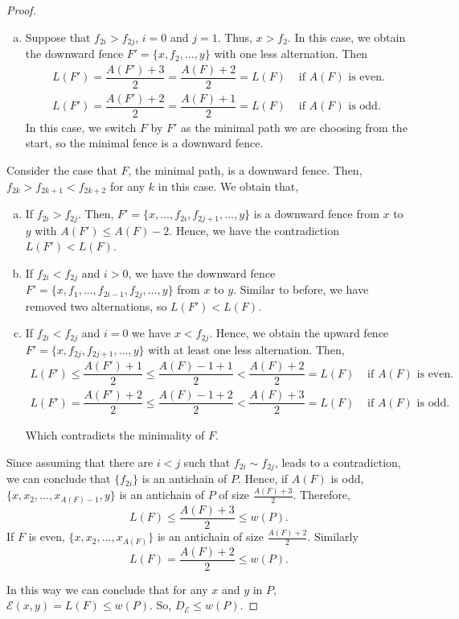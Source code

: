 \documentclass{article}[12pt]
\theoremstyle{exampstyle}
\theoremstyle{remark}
\newcommand{\E}{\mathcal{E}}
\begin{document}
\begin{proof}
\begin{enumerate}[a)]
        \item Suppose that $f_{2i} > f_{2j}$, $i =0$ and $j=1$. Thus, $x > f_2$. In this case, we obtain the downward fence $F'= \{ x , f_2, ..., y\}$ with one less alternation. Then
        \begin{align*}
            L(F') = \dfrac{A(F') + 3}{2} =  \dfrac{A(F) + 2}{2} = L(F) &  \text{ if } A(F) \text{ is even}. \\
            L(F') = \dfrac{A(F') + 2}{2} =  \dfrac{A(F) + 1}{2} = L(F) &  \text{ if } A(F) \text{ is odd}.
        \end{align*}
     In this case, we switch $F$ by $F'$ as the minimal path we are choosing from the start, so the minimal fence is a downward fence.
    \end{enumerate}
    
   Consider the case that $F$, the minimal path, is a downward fence. Then, $f_{2k} > f_{2k+1} < f_{2k+2}$ for any $k$ in this case. We obtain that,
   \begin{enumerate}[a)]
        \item If $f_{2i} > f_{2j}$. Then, $F' = \{ x, ..., f_{2i}, f_{2j+1}, ... ,y\}$ is a downward fence from $x$ to $y$ with $A(F') \leq A(F) - 2$. Hence, we have the contradiction $L(F') < L(F)$.
        \item If $f_{2i} < f_{2j}$ and $i > 0$, we have the downward fence $F' = \{ x, f_1, ..., f_{2i-1}, f_{2j}, ... ,y\}$ from $x$ to $y$. Similar to before, we have removed two alternations, so $L(F') < L(F)$.
        \item If $f_{2i} < f_{2j}$ and $i = 0$ we have $x < f_{2j}$. Hence, we obtain the upward fence $F' = \{ x, f_{2j}, f_{2j+1}, ..., y \}$ with at least one less alternation. Then, 
        \begin{align*}
            L(F') \leq \dfrac{A(F') + 1}{2} \leq  \dfrac{A(F) -1 + 1}{2} < \dfrac{A(F)+ 2}{2} = L(F) &  \text{ if } A(F) \text{ is even}. \\
            L(F') = \dfrac{A(F') + 2}{2} \leq  \dfrac{A(F) -1  + 2}{2} < \dfrac{A(F)+ 3}{2} = L(F) &  \text{ if } A(F) \text{ is odd}. 
        \end{align*}
        
        Which contradicts the minimality of $F$.
        
    \end{enumerate}

    Since assuming that there are $i < j$ such that $f_{2i} \sim f_{2j}$, leads to a contradiction, we can conclude that $\{f_{2i}\}$ is an antichain of $P$. 
    Hence, if $A(F)$ is odd, $\{x , x_2, ..., x_{A(F)-1}, y\}$ is an antichain of $P$ of size $\frac{A(F) + 3 }{2}$. Therefore, \[L(F) \leq \frac{A(F) + 3 }{2} \leq w(P).\] If $F$ is even, $\{x , x_2, ..., x_{A(F)}\}$ is an antichain of size $\frac{A(F) + 2 }{2}$. Similarly 
    \[ L(F) = \frac{A(F) + 2 }{2} \leq w(P) .\] 

In this way we can conclude that for any $x$ and $y$ in $P$, $\E(x,y) = L(F) \leq w(P)$. So, $D_\E \leq w(P)$.
\end{proof}
\end{document}
